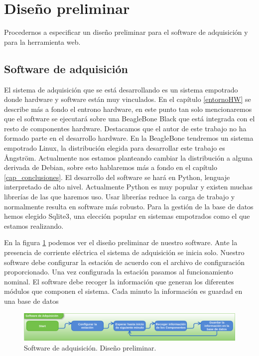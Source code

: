 \section{Diseño preliminar}
	Procedernos a especificar un diseño preliminar para el software de adquisición y para la herramienta web.
	\subsection{Software de adquisición}
		El sistema de adquisición que se está desarrollando es un sistema empotrado donde hardware y software están muy vinculados. En el capítulo 
		\ref{entornoHW} se describe más a fondo el entrono hardware, en este punto tan solo mencionaremos que el software se ejecutará sobre una BeagleBone Black\cite{Beagle}
		que está integrada con el resto de componentes hardware. Destacamos que el autor de este trabajo no ha formado parte en el desarrollo
		hardware. En la BeagleBone tendremos un sistema empotrado Linux, la distribución elegida para desarrollar este trabajo es Ångström. 
		Actualmente nos estamos planteando cambiar la distribución a alguna derivada de Debian, sobre esto hablaremos más a fondo en el capítulo 
		\ref{cap_conclusiones}. El desarrollo del software se hará en Python\cite{Python}, lenguaje interpretado de alto nivel. Actualmente Python es muy popular y existen muchas
		librerías de las que haremos uso. Usar librerías reduce la carga de trabajo y normalmente resulta en software más robusto. Para la gestión
		de la base de datos hemos elegido Sqlite3\cite{Sqlite}, una elección popular en sistemas empotrados como el que estamos realizando. 
		\par
		En la figura \ref{fig:soft_control_preliminar} podemos ver el diseño preliminar de nuestro software. Ante la presencia de corriente eléctrica el sistema de adquisición se
		inicia solo. Nuestro software debe configurar la estación de acuerdo con el archivo de configuración proporcionado. Una vez configurada la
		estación pasamos al funcionamiento nominal. El software debe recoger la información que generan los diferentes módulos que componen el
		sistema. Cada minuto la información es guardad en una base de datos
		\begin{figure}[h]
			\centering
			\includegraphics[keepaspectratio, width=1\textwidth]{./img/soft_control_preliminar.png}
			\caption{Software de adquisición. Diseño preliminar.}
			\label{fig:soft_control_preliminar}
		\end{figure}

